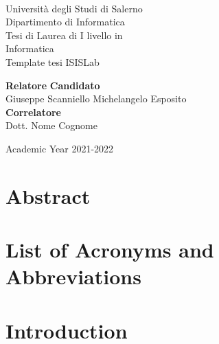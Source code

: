 \documentclass[11pt,oneside]{book}
\theoremstyle{definition}
\begin{document}
    \begin{titlepage}
        \begin{center}
            \\[0.2truecm]
            {\Large Universit\`a degli Studi di Salerno}\\[0.2truecm]
            {\large Dipartimento di Informatica}\\
            \hrulefill
            \vfill
            {\large Tesi di Laurea di I livello in }\\[0.2truecm]
            {\Large Informatica}\\
            \vfill\vfill
            {\Huge Template tesi ISISLab}
            \vfill\vfill
            
            
            {\bf Relatore} \hfill {\bf Candidato}\ \ \\
            Giuseppe Scanniello \hfill Michelangelo Esposito\\
            {\bf Correlatore} \hfill {\bf }\ \ \\
            Dott. Nome Cognome \hfill \ \ \\
            
            \vfill
            \hrulefill 
            
            Academic Year 2021-2022
        
        \end{center}
    \end{titlepage}


    \chapter*{Abstract}
    
    


    \tableofcontents
    \pagestyle{plain}

    \chapter*{List of Acronyms and Abbreviations}
    

    \chapter{Introduction}
    \setcounter{page}{1} 	%
    
\end{document}
